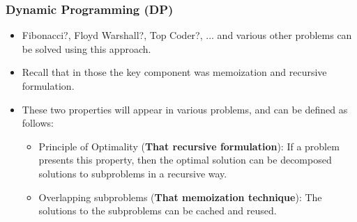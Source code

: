 \begin{frame}
    \frametitle{Dynamic Programming (DP)}
    \pause
    \begin{itemize}
        \item Fibonacci?, Floyd Warshall?, Top Coder?, ... and various other problems
              can be solved using this approach.

        \pause

        \item Recall that in those the key component was memoization and recursive
              formulation.

        \pause

        \item These two properties will appear in various problems, and can be defined
              as follows:
              \pause
              \begin{itemize}
                \item Principle of Optimality (\textbf{That recursive formulation}): If a
                      problem presents this property, then the optimal solution can
                      be decomposed solutions to subproblems in a recursive way.

                \pause
                
                \item Overlapping subproblems (\textbf{That memoization technique}): The 
                      solutions to the subproblems can be cached and reused.
              \end{itemize}

    \end{itemize}
\end{frame}
